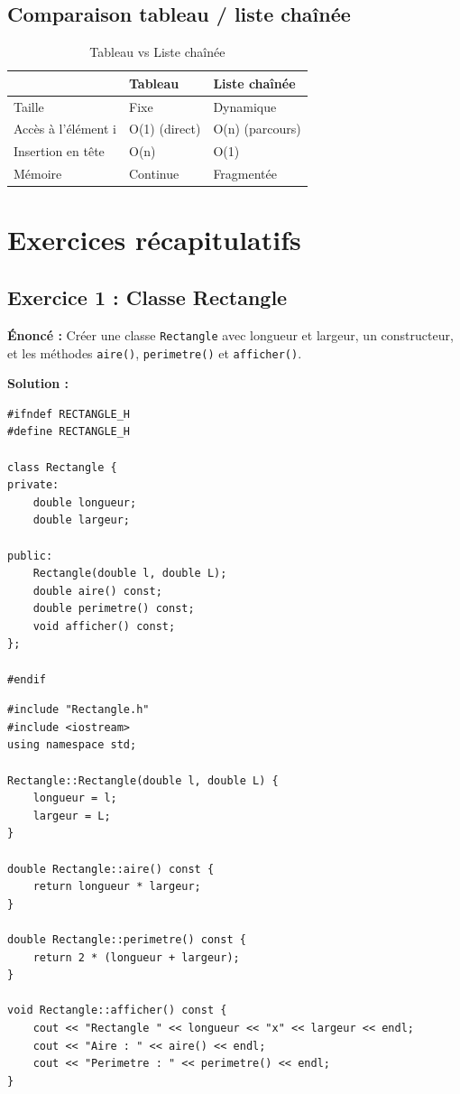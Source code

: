 \documentclass[12pt,a4paper]{article}
\begin{document}
\subsection{Comparaison tableau / liste chaînée}

\begin{table}[h!]
\centering
\caption{Tableau vs Liste chaînée}
\begin{tabular}{lll}
\toprule
 & \textbf{Tableau} & \textbf{Liste chaînée} \\
\midrule
Taille & Fixe & Dynamique \\
Accès à l'élément i & O(1) (direct) & O(n) (parcours) \\
Insertion en tête & O(n) & O(1) \\
Mémoire & Continue & Fragmentée \\
\bottomrule
\end{tabular}
\end{table}

\section{Exercices récapitulatifs}

\subsection{Exercice 1 : Classe Rectangle}

\textbf{Énoncé :} Créer une classe \texttt{Rectangle} avec longueur et largeur, un constructeur, et les méthodes \texttt{aire()}, \texttt{perimetre()} et \texttt{afficher()}.

\textbf{Solution :}

\begin{lstlisting}[style=cpp, caption={Rectangle.h}]
#ifndef RECTANGLE_H
#define RECTANGLE_H

class Rectangle {
private:
    double longueur;
    double largeur;

public:
    Rectangle(double l, double L);
    double aire() const;
    double perimetre() const;
    void afficher() const;
};

#endif
\end{lstlisting}

\begin{lstlisting}[style=cpp, caption={Rectangle.cpp}]
#include "Rectangle.h"
#include <iostream>
using namespace std;

Rectangle::Rectangle(double l, double L) {
    longueur = l;
    largeur = L;
}

double Rectangle::aire() const {
    return longueur * largeur;
}

double Rectangle::perimetre() const {
    return 2 * (longueur + largeur);
}

void Rectangle::afficher() const {
    cout << "Rectangle " << longueur << "x" << largeur << endl;
    cout << "Aire : " << aire() << endl;
    cout << "Perimetre : " << perimetre() << endl;
}
\end{lstlisting}
\end{document}
